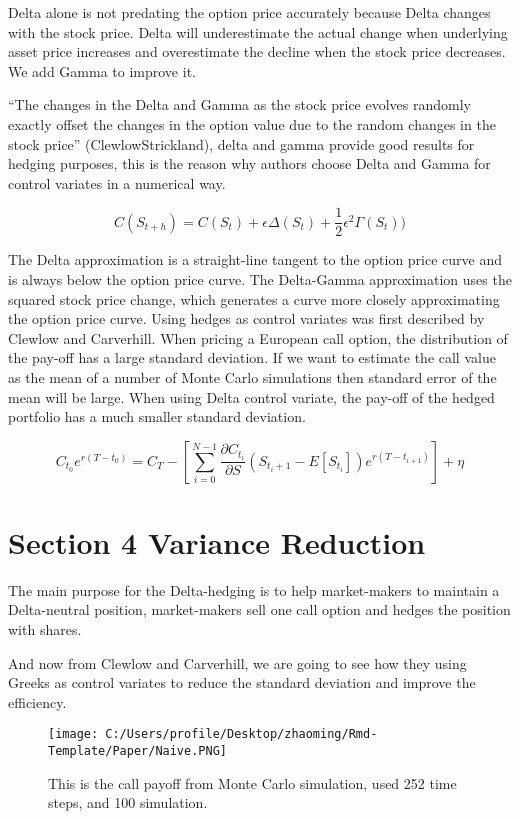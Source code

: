 \documentclass[11pt,]{article}
\makeatletter
\def\maxwidth{\ifdim\Gin@nat@width>\linewidth\linewidth
\else\Gin@nat@width\fi}
\let\Oldincludegraphics\includegraphics
\renewcommand{\includegraphics}[1]{\Oldincludegraphics[width=\maxwidth]{#1}}
\makeatother
\begin{document}
Delta alone is not predating the option price accurately because Delta
changes with the stock price. Delta will underestimate the actual change
when underlying asset price increases and overestimate the decline when
the stock price decreases. We add Gamma to improve it.

``The changes in the Delta and Gamma as the stock price evolves randomly
exactly offset the changes in the option value due to the random changes
in the stock price'' (ClewlowStrickland), delta and gamma provide good
results for hedging purposes, this is the reason why authors choose
Delta and Gamma for control variates in a numerical way.

\[
C(S_{t+h} )= C(S_t) + \epsilon \Delta(S_t) + \frac{1}{2}\epsilon^2\Gamma(S_t))
\]

The Delta approximation is a straight-line tangent to the option price
curve and is always below the option price curve. The Delta-Gamma
approximation uses the squared stock price change, which generates a
curve more closely approximating the option price curve. Using hedges as
control variates was first described by Clewlow and Carverhill. When
pricing a European call option, the distribution of the pay-off has a
large standard deviation. If we want to estimate the call value as the
mean of a number of Monte Carlo simulations then standard error of the
mean will be large. When using Delta control variate, the pay-off of the
hedged portfolio has a much smaller standard deviation.

\[
C_{t_0}e^{r(T-t_0)} = C_T - [\sum^{N-1}_{i=0}\frac{\partial C_{t_i}}{\partial S}(S_{t{_i+1}} - E[S_{t_i}])e^{r(T-t_{i+1})}] + \eta
\]

\hypertarget{section-4-variance-reduction}{%
\section{Section 4 Variance
Reduction}\label{section-4-variance-reduction}}

The main purpose for the Delta-hedging is to help market-makers to
maintain a Delta-neutral position, market-makers sell one call option
and hedges the position with shares.

And now from Clewlow and Carverhill, we are going to see how they using
Greeks as control variates to reduce the standard deviation and improve
the efficiency.

\begin{figure}
\centering
\texttt{[image: C:/Users/profile/Desktop/zhaoming/Rmd-Template/Paper/Naive.PNG]}
\caption{This is the call payoff from Monte Carlo simulation, used 252
time steps, and 100 simulation.}
\end{figure}
\end{document}
